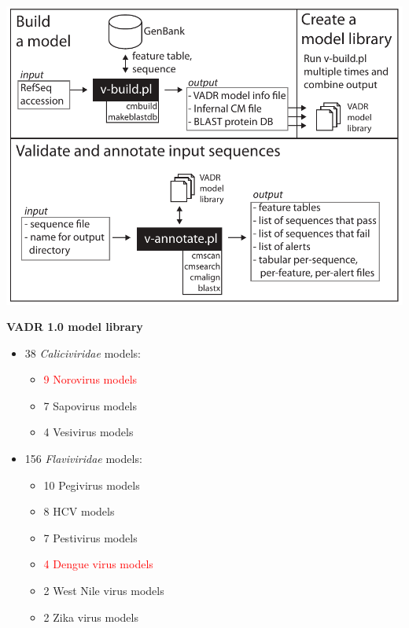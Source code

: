 \documentclass[landscape]{slides}
\begin{document}
\begin{slide}
\begin{center}

\includegraphics[width=10in]{figs/vadr}

\end{center}
\vfill
\end{slide}
\begin{slide}
\begin{center}
\normalsize
\textbf{VADR 1.0 model library}


\small
\begin{itemize}
\item 38 \emph{Caliciviridae} models:
  \begin{itemize}
  \item \textcolor{red}{9 Norovirus models}
  \item 7 Sapovirus models
  \item 4 Vesivirus models
  \end{itemize}
\item 156 \emph{Flaviviridae} models:
  \begin{itemize}
  \item 10 Pegivirus models
  \item 8 HCV models
  \item 7 Pestivirus models
  \item \textcolor{red}{4 Dengue virus models}
  \item 2 West Nile virus models
  \item 2 Zika virus models
  \end{itemize}
\end{itemize}

\end{center}

\vfill
\end{slide}
\end{document}
